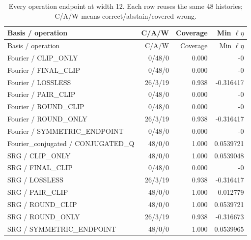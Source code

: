 \begin{longtable}{P{65mm}rrr}
\caption{Every operation endpoint at width 12. Each row reuses the same 48 histories; C/A/W means correct/abstain/covered wrong.}\\
\toprule Basis / operation & C/A/W & Coverage & Min $\ell\eta$\\\midrule\endfirsthead
\toprule Basis / operation & C/A/W & Coverage & Min $\ell\eta$\\\midrule\endhead
Fourier / CLIP\_ONLY & 0/48/0 & 0.000 & -0\\
Fourier / FINAL\_CLIP & 0/48/0 & 0.000 & -0\\
Fourier / LOSSLESS & 26/3/19 & 0.938 & -0.316417\\
Fourier / PAIR\_CLIP & 0/48/0 & 0.000 & -0\\
Fourier / ROUND\_CLIP & 0/48/0 & 0.000 & -0\\
Fourier / ROUND\_ONLY & 26/3/19 & 0.938 & -0.316417\\
Fourier / SYMMETRIC\_ENDPOINT & 0/48/0 & 0.000 & -0\\
Fourier\_conjugated / CONJUGATED\_Q & 48/0/0 & 1.000 & 0.0539721\\
SRG / CLIP\_ONLY & 48/0/0 & 1.000 & 0.0539048\\
SRG / FINAL\_CLIP & 0/48/0 & 0.000 & -0\\
SRG / LOSSLESS & 26/3/19 & 0.938 & -0.316417\\
SRG / PAIR\_CLIP & 48/0/0 & 1.000 & 0.012779\\
SRG / ROUND\_CLIP & 48/0/0 & 1.000 & 0.0539721\\
SRG / ROUND\_ONLY & 26/3/19 & 0.938 & -0.316673\\
SRG / SYMMETRIC\_ENDPOINT & 48/0/0 & 1.000 & 0.0539965\\
\bottomrule\end{longtable}

